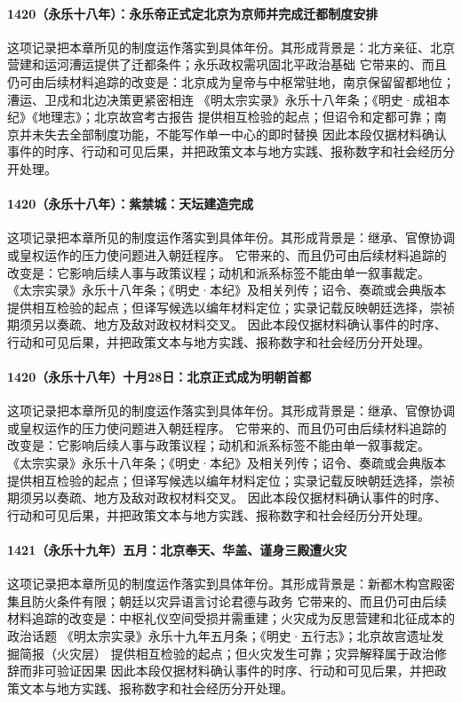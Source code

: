 \paragraph{1420（永乐十八年）：永乐帝正式定北京为京师并完成迁都制度安排} 这项记录把本章所见的制度运作落实到具体年份。其形成背景是：北方亲征、北京营建和运河漕运提供了迁都条件；永乐政权需巩固北平政治基础 它带来的、而且仍可由后续材料追踪的改变是：北京成为皇帝与中枢常驻地，南京保留留都地位；漕运、卫戍和北边决策更紧密相连 《明太宗实录》永乐十八年条；《明史·成祖本纪》《地理志》；北京故宫考古报告 提供相互检验的起点；但诏令和定都可靠；南京并未失去全部制度功能，不能写作单一中心的即时替换 因此本段仅据材料确认事件的时序、行动和可见后果，并把政策文本与地方实践、报称数字和社会经历分开处理。

\paragraph{1420（永乐十八年）：紫禁城：天坛建造完成} 这项记录把本章所见的制度运作落实到具体年份。其形成背景是：继承、官僚协调或皇权运作的压力使问题进入朝廷程序。 它带来的、而且仍可由后续材料追踪的改变是：它影响后续人事与政策议程；动机和派系标签不能由单一叙事裁定。 《太宗实录》永乐十八年条；《明史·本纪》及相关列传；诏令、奏疏或会典版本 提供相互检验的起点；但译写候选以编年材料定位；实录记载反映朝廷选择，崇祯期须另以奏疏、地方及敌对政权材料交叉。 因此本段仅据材料确认事件的时序、行动和可见后果，并把政策文本与地方实践、报称数字和社会经历分开处理。

\paragraph{1420（永乐十八年）十月28日：北京正式成为明朝首都} 这项记录把本章所见的制度运作落实到具体年份。其形成背景是：继承、官僚协调或皇权运作的压力使问题进入朝廷程序。 它带来的、而且仍可由后续材料追踪的改变是：它影响后续人事与政策议程；动机和派系标签不能由单一叙事裁定。 《太宗实录》永乐十八年条；《明史·本纪》及相关列传；诏令、奏疏或会典版本 提供相互检验的起点；但译写候选以编年材料定位；实录记载反映朝廷选择，崇祯期须另以奏疏、地方及敌对政权材料交叉。 因此本段仅据材料确认事件的时序、行动和可见后果，并把政策文本与地方实践、报称数字和社会经历分开处理。

\paragraph{1421（永乐十九年）五月：北京奉天、华盖、谨身三殿遭火灾} 这项记录把本章所见的制度运作落实到具体年份。其形成背景是：新都木构宫殿密集且防火条件有限；朝廷以灾异语言讨论君德与政务 它带来的、而且仍可由后续材料追踪的改变是：中枢礼仪空间受损并需重建；火灾成为反思营建和北征成本的政治话题 《明太宗实录》永乐十九年五月条；《明史·五行志》；北京故宫遗址发掘简报（火灾层） 提供相互检验的起点；但火灾发生可靠；灾异解释属于政治修辞而非可验证因果 因此本段仅据材料确认事件的时序、行动和可见后果，并把政策文本与地方实践、报称数字和社会经历分开处理。

